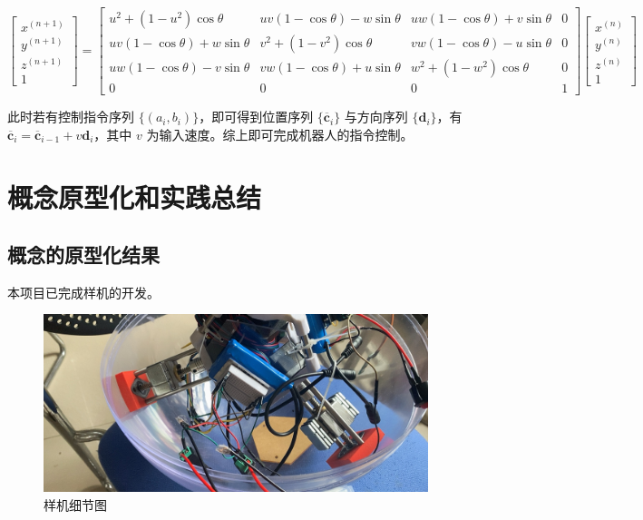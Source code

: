 \documentclass[a4paper]{ctexart}
\numberwithin{equation}{section}
\numberwithin{table}{section}
\numberwithin{figure}{section}
\begin{document}
\begin{equation}
  \begin{bmatrix}
    x^{(n+1)} \\
    y^{(n+1)} \\
    z^{(n+1)} \\
    1
  \end{bmatrix}
  =
  \begin{bmatrix}
    u^2+(1-u^2)\cos\theta & uv(1-\cos\theta)-w\sin\theta & uw(1-\cos\theta)+v\sin\theta & 0\\
    uv(1-\cos\theta)+w\sin\theta & v^2+(1-v^2)\cos\theta & vw(1-\cos\theta)-u\sin\theta & 0\\
    uw(1-\cos\theta)-v\sin\theta & vw(1-\cos\theta)+u\sin\theta & w^2+(1-w^2)\cos\theta & 0\\
    0 & 0 & 0 & 1
  \end{bmatrix}
  \begin{bmatrix}
    x^{(n)} \\
    y^{(n)} \\
    z^{(n)} \\
    1
  \end{bmatrix}
\end{equation}

此时若有控制指令序列 $\{(a_i,b_i)\}$，即可得到位置序列 $\{\overline{\boldsymbol c}_i\}$ 与方向序列 $\{\boldsymbol d_i\}$，有 $\overline{\boldsymbol c}_i = \overline{\boldsymbol c}_{i-1} + v\boldsymbol d_i$，其中 $v$ 为输入速度。综上即可完成机器人的指令控制。

\section{概念原型化和实践总结}

\subsection{概念的原型化结果}

本项目已完成样机的开发。

\begin{figure}[H]
  \begin{center}
    \includegraphics[width=0.8\linewidth]{figures/result1.png}
  \end{center}
  \caption{样机细节图}
\end{figure}
\end{document}
